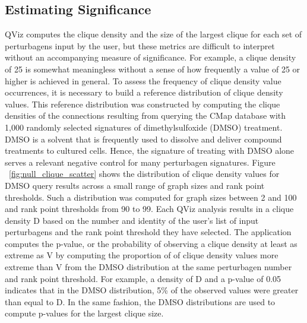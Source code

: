 \documentclass[12pt]{article}
\begin{document}
\subsection{Estimating Significance}
QViz computes the clique density and the size of the largest clique for each set of perturbagens input by the user, but these metrics are difficult to interpret without an accompanying measure of significance. For example, a clique density of 25 is somewhat meaningless without a sense of how frequently a value of 25 or higher is achieved in general. To assess the frequency of clique density value occurrences, it is necessary to build a reference distribution of clique density values. This reference distribution was constructed by computing the clique densities of the connections resulting from querying the CMap database with 1,000 randomly selected signatures of dimethylsulfoxide (DMSO) treatment. DMSO is a solvent that is frequently used to dissolve and deliver compound treatments to cultured cells. Hence, the signature of treating with DMSO alone serves a relevant negative control for many perturbagen signatures. 
Figure ~\ref{fig:null_clique_scatter} shows the distribution of clique density values for DMSO query results across a small range of graph sizes and rank point thresholds. Such a distribution was computed for graph sizes between 2 and 100 and rank point thresholds from 90 to 99. Each QViz analysis results in a clique density D based on the number and identity of the user's list of input perturbagens and the rank point threshold they have selected. The application computes the p-value, or the probability of observing a clique density at least as extreme as V by computing the proportion of of clique density values more extreme than V from the DMSO distribution at the same perturbagen number and rank point threshold. For example, a density of D and a p-value of 0.05 indicates that in the DMSO distribution, 5\% of the observed values were greater than equal to D. In the same fashion, the DMSO distributions are used to compute p-values for the largest clique size. 
\end{document}
